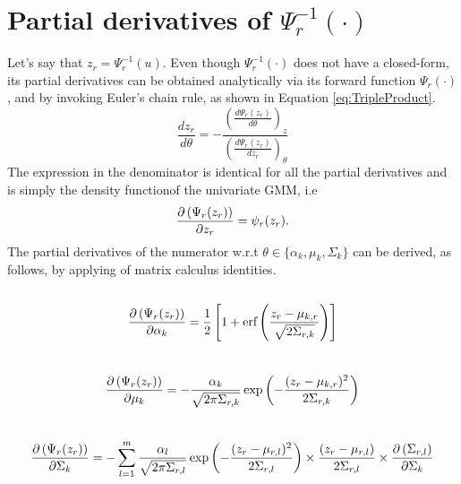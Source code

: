 \documentclass{article}
\theoremstyle{plain}
\theoremstyle{definition}
\theoremstyle{remark}
\begin{document}
\section{Partial derivatives of $\Psi^{-1}_r(\cdot)$}\label{apd:gmm_quantile_derivatives}
Let's say that $z_r=\Psi_r^{-1}(u)$. Even though $\Psi^{-1}_r(\cdot)$ does not have a closed-form, its partial derivatives can be obtained analytically via its forward function $\Psi_r(\cdot)$, and by invoking Euler's chain rule, as shown in Equation \eqref{eq:TripleProduct}.
\begin{equation}\label{eq:TripleProduct}
\frac{dz_r}{d\theta}=- \frac{\left(\frac{d\Psi_r(z_r)}{d\theta}\right)_z}{\left(\frac{d\Psi_r(z_r)}{dz_r}\right)_\theta}
\end{equation}
The expression in the denominator is identical for all the partial derivatives and is simply the density functionof the univariate GMM, i.e 
\begin{equation}\label{eq:Gamma_dz}
\der{z_r}{\Psi_r(z_r)}=\psi_r(z_r).
\end{equation}
The partial derivatives of the numerator w.r.t $\theta \in \{\alpha_k, \mu_k, \Sigma_k \}$ can be derived, as follows, by applying of matrix calculus identities.
\\
\\
\begin{equation}
\der{\alpha_k}{\Psi_r(z_r)}=\frac{1}{2}\left[1+ \erf \left( \frac{z_r-\mu_{k,r}}{\sqrt{2\Sigma_{r,k}}}\right) \right]
\end{equation}
\\
\begin{equation}
\der{\mu_k}{\Psi_r(z_r)}= -\frac{\alpha_k}{\sqrt{2\pi\Sigma_{r,k}}}\exp\left( - \frac{(z_r-\mu_{k,r})^2}{2\Sigma_{r,k}}	 \right)
\end{equation}
\\
\begin{equation}
\der{\Sigma_k}{\Psi_r(z_r)}= -\sum\limits_{l=1}^{m}\frac{\alpha_l}{\sqrt{2\pi\Sigma_{r,l}}}\exp\left( - \frac{(z_r-\mu_{r,l})^2}{2\Sigma_{r,l}} \right) \times \frac{(z_r-\mu_{r,l})}{2\Sigma_{r,l}} \times \der{\Sigma_k}{\Sigma_{r,l}}
\end{equation}
\end{document}

